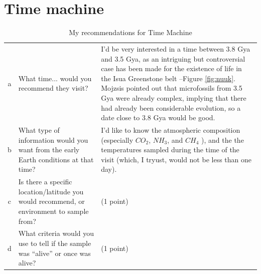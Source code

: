 \documentclass[]{article}
\begin{document}
\section{Time machine}

\begin{table}[H]
	\caption{My recommendations for Time Machine}
	{
	\begin{tabular}{|c|p{3cm}|p{8cm}| } \hline
		a&What time... would you recommend they visit? &I'd be very interested in a time between 3.8 Gya and 3.5 Gya, as an intriguing but controversial case has been made for the existence of life \cite{mojzsis1996evidence,nutman2016rapid} in the Isua Greenstone belt \cite{enwiki:1095301862}--Figure \ref{fig:nuuk}. Mojzsis\cite{mojzsis1996evidence} pointed out that microfossils from 3.5 Gya were already complex, implying that there had already been considerable evolution, so a date close to 3.8 Gya would be good.\\
		b& What type of information would you want from the early Earth conditions at that
		time?& I'd like to know the atmospheric composition (especially $CO_2$, $NH_3$, and $CH_4$ ), and the the temperatures sampled during the time of the visit (which, I tryust, would not be less than one day).\\
		c& Is there a specific location/latitude you would recommend, or environment to sample		from? &(1 point)\\
		d& What criteria would you use to tell if the sample was “alive” or once was alive? &(1	point)\\\hline
	\end{tabular}}
\end{table}
\end{document}
